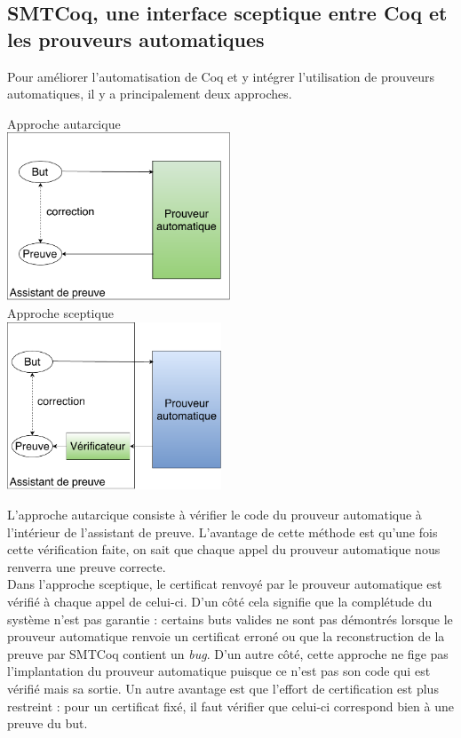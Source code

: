 \documentclass[11pt]{article}
\begin{document}
\subsection{SMTCoq, une interface sceptique entre Coq et les prouveurs automatiques}\label{sceptique_autarcique}

Pour améliorer l'automatisation de Coq et y intégrer l'utilisation de prouveurs automatiques, il y a principalement deux approches.

\begin{multicols}{2}
\begin{center}
Approche autarcique\\
\includegraphics[height=5cm]{1_Autarcique.pdf}\\
Approche sceptique\\
\includegraphics[height=5cm]{2_Sceptique.pdf}\\

\end{center}
\end{multicols}

L'approche autarcique consiste à vérifier le code du prouveur automatique à l'intérieur de l'assistant de preuve. L'avantage de cette méthode est qu'une fois cette vérification faite, on sait que chaque appel du prouveur automatique nous renverra une preuve correcte. \\

Dans l'approche sceptique, le certificat renvoyé par le prouveur automatique est vérifié à chaque appel de celui-ci. D'un côté cela signifie que la complétude du système n'est pas garantie : certains buts valides ne sont pas démontrés lorsque le prouveur automatique renvoie un certificat erroné ou que la reconstruction de la preuve par SMTCoq contient un \textit{bug}. D'un autre côté, cette approche ne fige pas l'implantation du prouveur automatique puisque ce n'est pas son code qui est vérifié mais sa sortie. Un autre avantage est que l'effort de certification est plus restreint : pour un certificat fixé, il faut vérifier que celui-ci correspond bien à une preuve du but.\\
\end{document}
